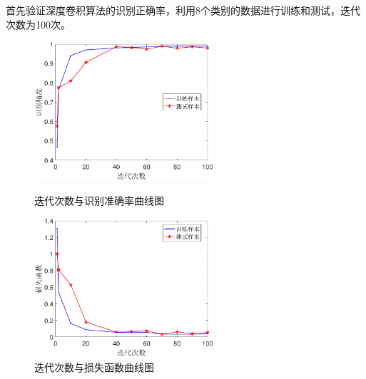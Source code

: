 
首先验证深度卷积算法的识别正确率，利用8个类别的数据进行训练和测试，迭代次数为100次。

\begin{figure}[hbt]
	\centering
	\begin{minipage}{7cm}
		\centering
		\includegraphics[width=6.67cm]{figures/emitter/diff_epoch}
		\caption{迭代次数与识别准确率曲线图}
		\label{fig:openset_epoch}
	\end{minipage}
	\hspace{10pt}
	\begin{minipage}{7cm}
		\centering
		\includegraphics[width=6.67cm]{figures/emitter/diff_loss}
		\caption{迭代次数与损失函数曲线图}
		\label{fig:diff_loss}
	\end{minipage}

\end{figure}

